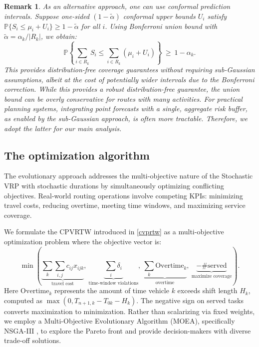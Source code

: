 \documentclass[preprint,12pt]{elsarticle}
\newtheorem{remark}{Remark}[section]
\begin{document}


\begin{remark}
As an alternative approach, one can use conformal prediction intervals. Suppose one-sided $(1-\tilde{\alpha})$ conformal upper bounds $U_i$ satisfy $\mathbb{P}\{S_i \le \mu_i + U_i\} \ge 1-\tilde{\alpha}$ for all $i$. Using Bonferroni union bound with $\tilde{\alpha}=\alpha_k/|R_k|$, we obtain:
\begin{equation}
\mathbb{P}\left\{\sum_{i\in R_k} S_i \le \sum_{i\in R_k} (\mu_i + U_i) \right\}
\ \ge\ 1-\alpha_k.
\end{equation}
This provides distribution-free coverage guarantees without requiring sub-Gaussian assumptions, albeit at the cost of potentially wider intervals due to the Bonferroni correction. While this provides a robust distribution-free guarantee, the union bound can be overly conservative for routes with many activities. For practical planning systems, integrating point forecasts with a single, aggregate risk buffer, as enabled by the sub-Gaussian approach, is often more tractable. Therefore, we adopt the latter for our main analysis.
\end{remark}


\subsection{The optimization algorithm}

The evolutionary approach addresses the multi-objective nature of the Stochastic VRP with stochastic durations by simultaneously optimizing conflicting objectives. Real-world routing operations involve competing KPIs: minimizing travel costs, reducing overtime, meeting time windows, and maximizing service coverage. 


We formulate the CPVRTW introduced in \ref{cvprtw} as a multi-objective optimization problem where the objective vector is:
\begin{equation}\label{eq:multi_obj}
\min\left( \underbrace{\sum_{k}\sum_{i,j} c_{ij}x_{ijk}}_{\text{travel cost}},\ \underbrace{\sum_i \delta_i}_{\text{time-window violations}},\ \underbrace{\sum_k \mathrm{Overtime}_k}_{\text{overtime}},\ \underbrace{-\#\text{served}}_{\text{maximize coverage}} \right).
\end{equation}
Here $\mathrm{Overtime}_k$ represents the amount of time vehicle $k$ exceeds shift length $H_k$, computed as $\max(0, T_{n+1,k}-T_{0k}-H_k)$. The negative sign on served tasks converts maximization to minimization. Rather than scalarizing via fixed weights, we employ a Multi-Objective Evolutionary Algorithm (MOEA), specifically NSGA-III \cite{nsga3}, to explore the Pareto front and provide decision-makers with diverse trade-off solutions.
\end{document}

